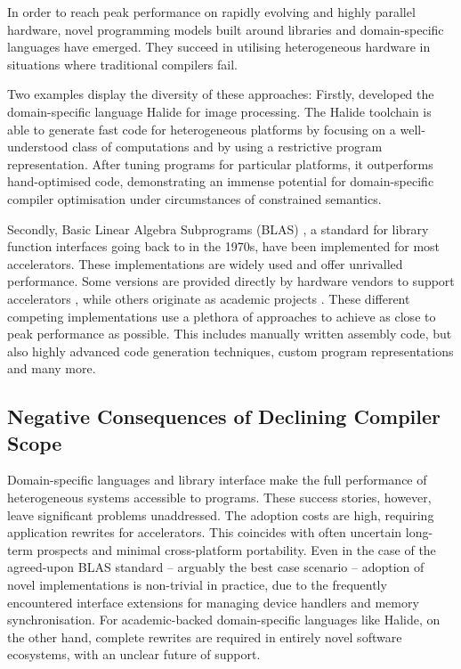     In order to reach peak performance on rapidly evolving and highly parallel
    hardware, novel programming models built around libraries and
    domain-specific languages have emerged.
    They succeed in utilising heterogeneous hardware in situations where
    traditional compilers fail.

    Two examples display the diversity of these approaches:
    Firstly, \citet{Ragan-Kelley2013Halide} developed the domain-specific
    language Halide for image processing.
    The Halide toolchain is able to generate fast code for heterogeneous
    platforms by focusing on a well-understood class of computations and by
    using a restrictive program representation.
    After tuning programs for particular platforms, it outperforms
    hand-optimised code, demonstrating an immense potential for domain-specific
    compiler optimisation under circumstances of constrained semantics.

    Secondly, Basic Linear Algebra Subprograms (BLAS)
    \citep{2002:USB:567806.567807}, a standard for library function interfaces
    going back to \citet{Lawson:1979:BLA:355841.355847} in the 1970s, have been
    implemented for most accelerators.
    These implementations are widely used and offer unrivalled performance.
    Some versions are provided directly by hardware vendors to support
    accelerators \citep{mkl,cublas,clblas,apl,qml}, while others originate as
    academic projects \citep{Wang:2013:AAG:2503210.2503219}.
    These different competing implementations use a plethora of approaches to achieve as
    close to peak performance as possible.
    This includes manually written assembly code, but also highly advanced
    code generation techniques, custom program representations and many more.

\subsection{Negative Consequences of Declining Compiler Scope}

    Domain-specific languages and library interface make the full performance of
    heterogeneous systems accessible to programs.
    These success stories, however, leave significant problems unaddressed.
    The adoption costs are high, requiring application rewrites for
    accelerators.
    This coincides with often uncertain long-term prospects and minimal
    cross-platform portability.
    Even in the case of the agreed-upon BLAS standard -- arguably the best case
    scenario -- adoption of novel implementations is non-trivial in practice,
    due to the frequently encountered interface extensions for managing device
    handlers and memory synchronisation.
    For academic-backed domain-specific languages like Halide, on the other
    hand, complete rewrites are required in entirely novel software ecosystems,
    with an unclear future of support.

